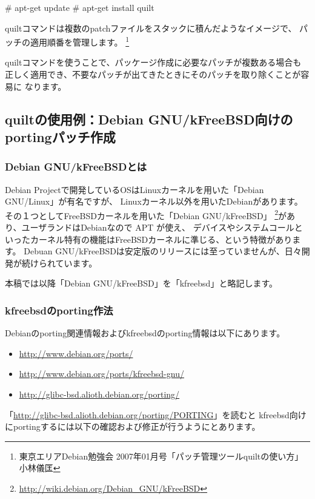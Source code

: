 \documentclass[mingoth,a4paper]{jsarticle}
\begin{document}
\begin{commandline}
# apt-get update
# apt-get install quilt
\end{commandline}

quiltコマンドは複数のpatchファイルをスタックに積んだようなイメージで、
パッチの適用順番を管理します。
\footnote{東京エリアDebian勉強会 2007年01月号「パッチ管理ツールquiltの使い方」小林儀匡}

quiltコマンドを使うことで、パッケージ作成に必要なパッチが複数ある場合も
正しく適用でき、不要なパッチが出てきたときにそのパッチを取り除くことが容易に
なります。


\subsection{quiltの使用例：Debian GNU/kFreeBSD向けのportingパッチ作成}

\subsubsection{Debian GNU/kFreeBSDとは}
Debian Projectで開発しているOSはLinuxカーネルを用いた「Debian GNU/Linux」が有名ですが、
Linuxカーネル以外を用いたDebianがあります。その１つとしてFreeBSDカーネルを用いた「Debian GNU/kFreeBSD」
\footnote{\url{http://wiki.debian.org/Debian\_GNU/kFreeBSD}}があり、ユーザランドはDebianなので APT が使え、
デバイスやシステムコールといったカーネル特有の機能はFreeBSDカーネルに準じる、という特徴があります。
Debuan GNU/kFreeBSDは安定版のリリースには至っていませんが、日々開発が続けられています。

本稿では以降「Debian GNU/kFreeBSD」を「kfreebsd」と略記します。

\subsubsection{kfreebsdのporting作法}
Debianのporting関連情報およびkfreebsdのporting情報は以下にあります。

\begin{itemize}
 \item{\url{http://www.debian.org/ports/}}
 \item{\url{http://www.debian.org/ports/kfreebsd-gnu/}}
 \item{\url{http://glibc-bsd.alioth.debian.org/porting/}}
\end{itemize}

「\url{http://glibc-bsd.alioth.debian.org/porting/PORTING}」を読むと
kfreebsd向けにportingするには以下の確認および修正が行うようにとあります。
\end{document}
